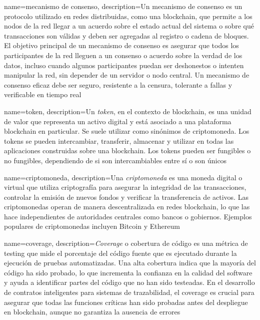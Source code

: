 {
    name=mecanismo de consenso,
    description={Un mecanismo de consenso es un protocolo utilizado en redes distribuidas, como una blockchain, que permite a los nodos de la red llegar a un acuerdo sobre el estado actual del sistema o sobre qué transacciones son válidas y deben ser agregadas al registro o cadena de bloques. El objetivo principal de un mecanismo de consenso es asegurar que todos los participantes de la red lleguen a un consenso o acuerdo sobre la verdad de los datos, incluso cuando algunos participantes puedan ser deshonestos o intenten manipular la red, sin depender de un servidor o nodo central. Un mecanismo de consenso eficaz debe ser seguro, resistente a la censura, tolerante a fallas y verificable en tiempo real \cite{diaz2022protocolos}}
}

{
    name=token,
    description={Un \textit{token}, en el contexto de blockchain, es una unidad de valor que representa un activo digital y está asociado a una plataforma blockchain en particular. Se suele utilizar como sinónimos de criptomoneda. Los tokens se pueden intercambiar, transferir, almacenar y utilizar en todas las aplicaciones construidas sobre una blockchain. Los tokens pueden ser fungibles o no fungibles, dependiendo de si son intercambiables entre sí o son únicos}
}

{
    name=criptomoneda,
    description={Una \textit{criptomoneda} es una moneda digital o virtual que utiliza criptografía para asegurar la integridad de las transacciones, controlar la emisión de nuevos fondos y verificar la transferencia de activos. Las criptomonedas operan de manera descentralizada en redes blockchain, lo que las hace independientes de autoridades centrales como bancos o gobiernos. Ejemplos populares de criptomonedas incluyen Bitcoin y Ethereum}
}

{
    name=coverage,
    description={\textit{Coverage} o  cobertura de código es una métrica de testing que mide el porcentaje del código fuente que es ejecutado durante la ejecución de pruebas automatizadas. Una alta cobertura indica que la mayoría del código ha sido probado, lo que incrementa la confianza en la calidad del software y ayuda a identificar partes del código que no han sido testeadas. En el desarrollo de contratos inteligentes para sistemas de trazabilidad, el coverage es crucial para asegurar que todas las funciones críticas han sido probadas antes del despliegue en blockchain, aunque no garantiza la ausencia de errores}
}

